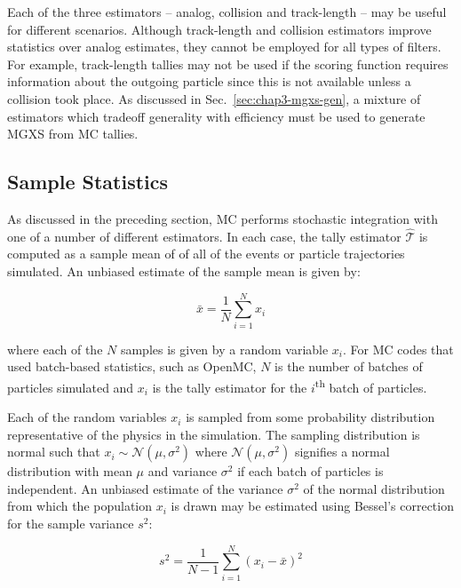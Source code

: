 Each of the three estimators -- analog, collision and track-length -- may be useful for different scenarios. Although track-length and collision estimators improve statistics over analog estimates, they cannot be employed for all types of filters. For example, track-length tallies may not be used if the scoring function requires information about the outgoing particle since this is not available unless a collision took place. As discussed in Sec.~\ref{sec:chap3-mgxs-gen}, a mixture of estimators which tradeoff generality with efficiency must be used to generate \ac{MGXS} from \ac{MC} tallies.


\subsection{Sample Statistics}
\label{subsec:chap3-mc-stats}

As discussed in the preceding section, \ac{MC} performs stochastic integration with one of a number of different estimators. In each case, the tally estimator $\hat{\mathcal{T}}$ is computed as a sample mean of of all of the events or particle trajectories simulated. An unbiased estimate of the sample mean is given by:

\begin{equation}
\label{eqn:chap3-sample-mean}
\bar{x} = \frac{1}{N} \displaystyle\sum\limits_{i=1}^{N} x_{i}
\end{equation}

\noindent where each of the $N$ samples is given by a random variable $x_{i}$. For \ac{MC} codes that used batch-based statistics, such as OpenMC, $N$ is the number of batches of particles simulated and $x_{i}$ is the tally estimator for the $i$\textsuperscript{th} batch of particles. 

Each of the random variables $x_{i}$ is sampled from some probability distribution representative of the physics in the simulation. The sampling distribution is normal such that $x_{i} \sim \mathcal{N}(\mu,\sigma^{2})$ where $\mathcal{N}(\mu,\sigma^{2})$ signifies a normal distribution with mean $\mu$ and variance $\sigma^{2}$ if each batch of particles is independent. An unbiased estimate of the variance $\sigma^{2}$ of the normal distribution from which the population $x_{i}$ is drawn may be estimated using Bessel's correction for the sample variance $s^{2}$:

\begin{equation}
\label{eqn:chap3-variance-sample}
s^{2} = \frac{1}{N-1}\displaystyle\sum\limits_{i=1}^{N}\left(x_{i} - \bar{x}\right)^{2}
\end{equation}

